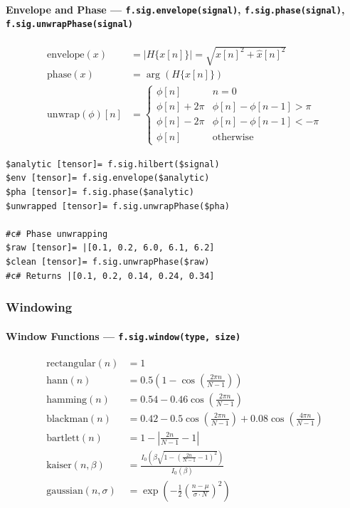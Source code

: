 \paragraph{Envelope and Phase --- \texttt{f.sig.envelope(signal)}, \texttt{f.sig.phase(signal)}, \texttt{f.sig.unwrapPhase(signal)}}

\begin{align}
\text{envelope}(x) &= |H\{x[n]\}| = \sqrt{x[n]^2 + \hat{x}[n]^2} \label{eq:sig-envelope} \\
\text{phase}(x) &= \arg(H\{x[n]\}) \label{eq:sig-phase} \\
\text{unwrap}(\phi)[n] &= \begin{cases}
\phi[n] & n = 0 \\
\phi[n] + 2\pi & \phi[n] - \phi[n-1] > \pi \\
\phi[n] - 2\pi & \phi[n] - \phi[n-1] < -\pi \\
\phi[n] & \text{otherwise}
\end{cases} \label{eq:sig-unwrap}
\end{align}

\begin{verbatim}
$analytic [tensor]= f.sig.hilbert($signal)
$env [tensor]= f.sig.envelope($analytic)
$pha [tensor]= f.sig.phase($analytic)
$unwrapped [tensor]= f.sig.unwrapPhase($pha)

#c# Phase unwrapping
$raw [tensor]= |[0.1, 0.2, 6.0, 6.1, 6.2]
$clean [tensor]= f.sig.unwrapPhase($raw)
#c# Returns |[0.1, 0.2, 0.14, 0.24, 0.34]
\end{verbatim}

\subsubsection{Windowing}

\paragraph{Window Functions --- \texttt{f.sig.window(type, size)}}

\begin{align}
\text{rectangular}(n) &= 1 \label{eq:win-rect} \\
\text{hann}(n) &= 0.5 \left(1 - \cos\left(\frac{2\pi n}{N-1}\right)\right) \label{eq:win-hann} \\
\text{hamming}(n) &= 0.54 - 0.46 \cos\left(\frac{2\pi n}{N-1}\right) \label{eq:win-hamming} \\
\text{blackman}(n) &= 0.42 - 0.5 \cos\left(\frac{2\pi n}{N-1}\right) + 0.08 \cos\left(\frac{4\pi n}{N-1}\right) \label{eq:win-blackman} \\
\text{bartlett}(n) &= 1 - \left|\frac{2n}{N-1} - 1\right| \label{eq:win-bartlett} \\
\text{kaiser}(n, \beta) &= \frac{I_0\left(\beta \sqrt{1 - \left(\frac{2n}{N-1} - 1\right)^2}\right)}{I_0(\beta)} \label{eq:win-kaiser} \\
\text{gaussian}(n, \sigma) &= \exp\left(-\frac{1}{2}\left(\frac{n - \mu}{\sigma \cdot N}\right)^2\right) \label{eq:win-gaussian}
\end{align}

